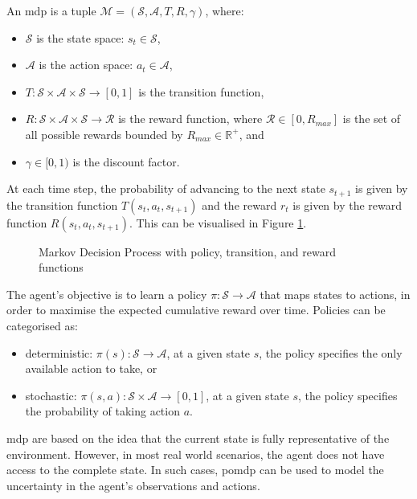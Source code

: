 \begin{definition}
    An \acrshort{mdp} is a tuple $\mathcal{M} = \left(\mathcal{S}, \mathcal{A}, T, R, \gamma\right)$, where:
    \begin{itemize}
        \item $\mathcal{S}$ is the state space: $s_t \in \mathcal{S}$,
        \item $\mathcal{A}$ is the action space: $a_t \in \mathcal{A}$,
        \item $T: \mathcal{S} \times \mathcal{A} \times \mathcal{S} \rightarrow [0, 1]$ is the transition function,
        \item $R: \mathcal{S} \times \mathcal{A} \times \mathcal{S} \rightarrow \mathcal{R}$ is the reward function, where $\mathcal{R} \in \left[0, R_{max}\right]$ is the set of all possible rewards bounded by $R_{max} \in \mathbb{R}^+$, and
        \item $\gamma \in [0, 1)$ is the discount factor.
    \end{itemize}
    
\end{definition}

At each time step, the probability of advancing to the next state $s_{t+1}$ is given by the transition function $T(s_t, a_t, s_{t+1})$ and the reward $r_t$ is given by the reward function $R(s_t, a_t, s_{t+1})$. This can be visualised in Figure \ref{fig:mdp}.

\begin{figure}[ht]
    \centering
    
    \caption{Markov Decision Process with policy, transition, and reward functions}
    \label{fig:mdp}
\end{figure}

The agent's objective is to learn a policy $\pi: \mathcal{S} \rightarrow \mathcal{A}$ that maps states to actions, in order to maximise the expected cumulative reward over time. Policies can be categorised as:
\begin{itemize}
    \item deterministic: $\pi(s) : \mathcal{S} \to \mathcal{A}$, at a given state $s$, the policy specifies the only available action to take, or
    \item stochastic: $\pi(s, a) : \mathcal{S} \times \mathcal{A} \to [0, 1]$, at a given state $s$, the policy specifies the probability of taking action $a$.
\end{itemize}

\acrlong{mdp} are based on the idea that the current state is fully representative of the environment. However, in most real world scenarios, the agent does not have access to the complete state. In such cases, \acrfull{pomdp} can be used to model the uncertainty in the agent's observations and actions.

